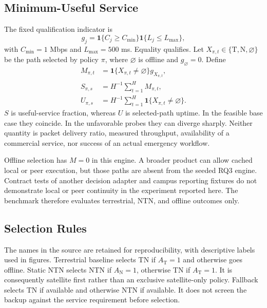 \documentclass{IEEEoj}
\newcommand{\ind}{\mathbf{1}}
\newcommand{\TN}{\mathrm{T}}
\newcommand{\NTN}{\mathrm{N}}
\begin{document}
\subsection{Minimum-Useful Service}
The fixed qualification indicator is
\begin{equation}\label{eq:qualification}
 g_j=\ind\{C_j\ge C_{\min}\}\ind\{L_j\le L_{\max}\},
\end{equation}
with $C_{\min}=1$ Mbps and $L_{\max}=500$ ms. Equality qualifies. Let $X_{\pi,t}\in\{\TN,\NTN,\varnothing\}$ be the path selected by policy $\pi$, where $\varnothing$ is offline and $g_{\varnothing}=0$. Define
\begin{align}
 M_{\pi,t}&=\ind\{X_{\pi,t}\ne\varnothing\}g_{X_{\pi,t}},\\
 S_{\pi,s}&=H^{-1}\sum_{t=1}^{H}M_{\pi,t},\label{eq:service}\\
 U_{\pi,s}&=H^{-1}\sum_{t=1}^{H}\ind\{X_{\pi,t}\ne\varnothing\}.
\end{align}
$S$ is useful-service fraction, whereas $U$ is selected-path uptime. In the feasible base case they coincide. In the unfavorable probes they can diverge sharply. Neither quantity is packet delivery ratio, measured throughput, availability of a commercial service, nor success of an actual emergency workflow.

Offline selection has $M=0$ in this engine. A broader product can allow cached local or peer execution, but those paths are absent from the seeded RQ3 engine. Contract tests of another decision adapter and campus reporting fixtures do not demonstrate local or peer continuity in the experiment reported here. The benchmark therefore evaluates terrestrial, NTN, and offline outcomes only.

\subsection{Selection Rules}
The names in the source are retained for reproducibility, with descriptive labels used in figures. Terrestrial baseline selects TN if $A_\TN=1$ and otherwise goes offline. Static NTN selects NTN if $A_\NTN=1$, otherwise TN if $A_\TN=1$. It is consequently satellite first rather than an exclusive satellite-only policy. Fallback selects TN if available and otherwise NTN if available. It does not screen the backup against the service requirement before selection.
\end{document}
